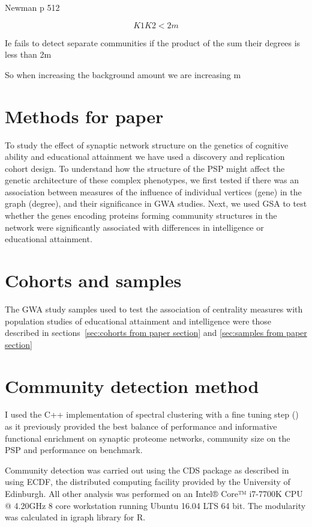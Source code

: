 Newman p 512

\begin{equation}
    K1K2 < 2m
\end{equation}

Ie fails to detect separate communities if the product of the sum their degrees is less than 2m

So when increasing the background amount we are increasing m

\section{Methods for paper}
\label{sec: community detection methods from paper}
To study the effect of synaptic network structure on the genetics of cognitive ability and educational attainment we have used a discovery and replication cohort design. To understand how the structure of the PSP might affect the genetic architecture of these complex phenotypes, we first tested if there was an association between measures of the influence of individual vertices (gene) in the graph (degree), and their significance in GWA studies. 
Next, we used GSA to test whether the genes encoding proteins forming community structures in the network were significantly associated with differences in intelligence or educational attainment. 


\section{Cohorts and samples}

The GWA study samples used to test the association of centrality measures with population studies of educational attainment and intelligence were those described in sections~\ref{sec:cohorts from paper section} and \ref{sec:samples from paper section}


\section{Community detection method}
\label{sec:community detection method paper section}

I used the C++ implementation of spectral clustering with a fine tuning step () as it previously provided the best balance of performance and informative functional enrichment on synaptic proteome networks\cite{mclean2016improved}, community size on the PSP and performance on benchmark. 

Community detection was carried out using the CDS package as described in \cite{mclean2016improved} using ECDF, the distributed computing facility provided by the University of Edinburgh. All other analysis was performed on an Intel® Core™ i7-7700K CPU @ 4.20GHz 8 core workstation running Ubuntu 16.04 LTS 64 bit.  
The modularity was calculated in igraph library for R\cite{csardi2006igraph}. 

